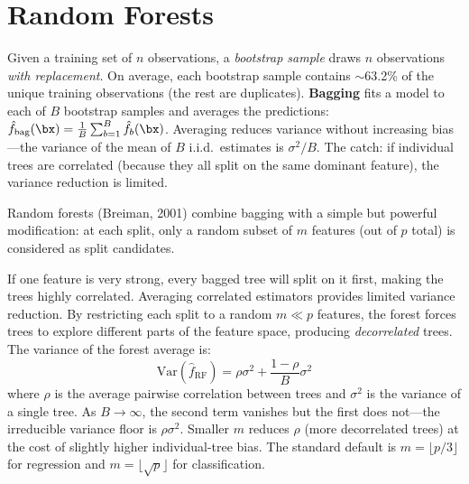 \section{Random Forests}
\label{sec:random-forests}

\begin{prereq}
Given a training set of $n$ observations, a \emph{bootstrap sample} draws $n$ observations \emph{with replacement}.
On average, each bootstrap sample contains $\sim$63.2\% of the unique training observations (the rest are duplicates).
\textbf{Bagging} fits a model to each of $B$ bootstrap samples and averages the predictions:
$\hat{f}_{\mathrm{bag}}(\bx) = \frac{1}{B}\sum_{b=1}^B \hat{f}_b(\bx)$.
Averaging reduces variance without increasing bias---the variance of the mean of $B$ i.i.d.\ estimates is $\sigma^2/B$.
The catch: if individual trees are correlated (because they all split on the same dominant feature), the variance reduction is limited.
\end{prereq}

Random forests (Breiman, 2001) combine bagging with a simple but powerful modification: at each split, only a random subset of $m$ features (out of $p$ total) is considered as split candidates.

\begin{keyidea}
If one feature is very strong, every bagged tree will split on it first, making the trees highly correlated.
Averaging correlated estimators provides limited variance reduction.
By restricting each split to a random $m \ll p$ features, the forest forces trees to explore different parts of the feature space, producing \emph{decorrelated} trees.
The variance of the forest average is:
\begin{equation}
\mathrm{Var}(\hat{f}_{\mathrm{RF}}) = \rho \sigma^2 + \frac{1-\rho}{B}\sigma^2
\label{eq:rf-variance}
\end{equation}
where $\rho$ is the average pairwise correlation between trees and $\sigma^2$ is the variance of a single tree.
As $B \to \infty$, the second term vanishes but the first does not---the irreducible variance floor is $\rho\sigma^2$.
Smaller $m$ reduces $\rho$ (more decorrelated trees) at the cost of slightly higher individual-tree bias.
The standard default is $m = \lfloor p/3 \rfloor$ for regression and $m = \lfloor \sqrt{p} \rfloor$ for classification.
\end{keyidea}

